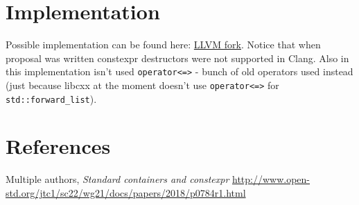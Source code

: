 \documentclass{wg21}
\newcommand{\cc}[1]{\texttt{#1}}
\begin{document}
\section{Implementation}
Possible implementation can be found here: \href{https://github.com/ZaMaZaN4iK/llvm-project/tree/feature/forward_list_constexpr}{LLVM fork}. Notice that when proposal was written constexpr destructors were not supported in Clang. Also in this implementation isn't used \cc{operator<=>} - bunch of old operators used instead (just because libcxx at the moment doesn't use \cc{operator<=>} for \cc{std::forward_list}).

\section{References}
\renewcommand{\section}[2]{}%
\begin{thebibliography}{9}

  Multiple authors,
  \emph{Standard containers and constexpr}\newline
  \url{http://www.open-std.org/jtc1/sc22/wg21/docs/papers/2018/p0784r1.html}

\end{thebibliography}
\end{document}
